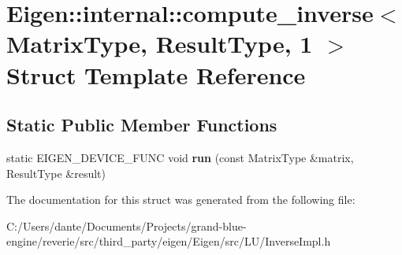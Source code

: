\hypertarget{struct_eigen_1_1internal_1_1compute__inverse_3_01_matrix_type_00_01_result_type_00_011_01_4}{}\section{Eigen\+::internal\+::compute\+\_\+inverse$<$ Matrix\+Type, Result\+Type, 1 $>$ Struct Template Reference}
\label{struct_eigen_1_1internal_1_1compute__inverse_3_01_matrix_type_00_01_result_type_00_011_01_4}
\subsection*{Static Public Member Functions}
\begin{DoxyCompactItemize}
\item 
\mbox{\label{struct_eigen_1_1internal_1_1compute__inverse_3_01_matrix_type_00_01_result_type_00_011_01_4_a6ba9f9ce7e13e2da7a335b8460f211a7}} 
static E\+I\+G\+E\+N\+\_\+\+D\+E\+V\+I\+C\+E\+\_\+\+F\+U\+NC void {\bfseries run} (const Matrix\+Type \&matrix, Result\+Type \&result)
\end{DoxyCompactItemize}


The documentation for this struct was generated from the following file\+:\begin{DoxyCompactItemize}
\item 
C\+:/\+Users/dante/\+Documents/\+Projects/grand-\/blue-\/engine/reverie/src/third\+\_\+party/eigen/\+Eigen/src/\+L\+U/Inverse\+Impl.\+h\end{DoxyCompactItemize}
